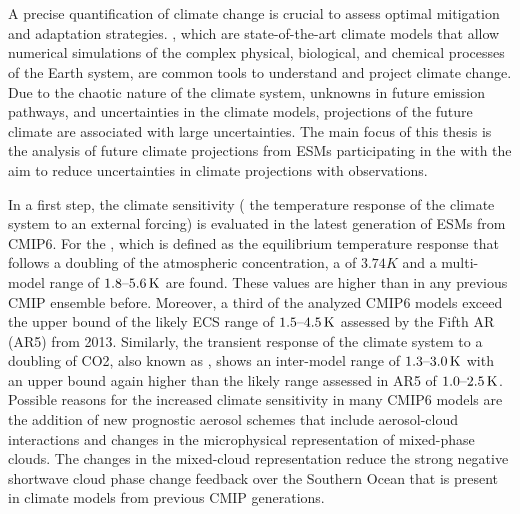 
%



\chapter{\abstractname}

A precise quantification of climate change is crucial to assess optimal
mitigation and adaptation strategies. , which are
state-of-the-art climate models that allow numerical simulations of the complex
physical, biological, and chemical processes of the Earth system, are common
tools to understand and project climate change. Due to the chaotic nature of
the climate system, unknowns in future emission pathways, and uncertainties in
the climate models, projections of the future climate are associated with large
uncertainties. The main focus of this thesis is the analysis of future climate
projections from \acsp{ESM} participating in the  with the
aim to reduce uncertainties in climate projections with observations.

In a first step, the climate sensitivity (\ie{} the temperature response of the
climate system to an external forcing) is evaluated in the latest generation of
\acsp{ESM} from \acs{CMIP}6. For the , which is defined as the
equilibrium temperature response that follows a doubling of the atmospheric
 concentration, a  of $3.74 \unit{K}$ and a
multi-model range of $\rangeunit{1.8}{5.6}{K}$ are found. These values are
higher than in any previous \acs{CMIP} ensemble before. Moreover, a third of
the analyzed \acs{CMIP}6 models exceed the upper bound of the likely \acs{ECS}
range of $\rangeunit{1.5}{4.5}{K}$ assessed by the  Fifth
\acl{AR} (\acs{AR}5) from 2013. Similarly, the transient response of the
climate system to a doubling of \acs{CO2}, also known as ,
shows an inter-model range of $\rangeunit{1.3}{3.0}{K}$ with an upper bound
again higher than the likely range assessed in \acs{AR}5 of
$\rangeunit{1.0}{2.5}{K}$. Possible reasons for the increased climate
sensitivity in many \acs{CMIP}6 models are the addition of new prognostic
aerosol schemes that include aerosol-cloud interactions and changes in the
microphysical representation of mixed-phase clouds. The changes in the
mixed-cloud representation reduce the strong negative shortwave cloud phase
change feedback over the Southern Ocean that is present in climate models from
previous \acs{CMIP} generations.

